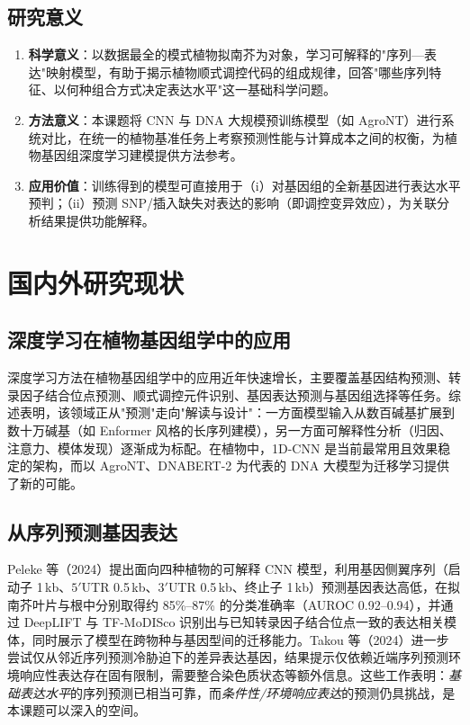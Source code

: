\documentclass[UTF8,11pt,a4paper]{ctexart}
\begin{document}
\subsection{研究意义}
\label{sec:intro-sig}

\begin{enumerate}
\item \textbf{科学意义}：以数据最全的模式植物拟南芥为对象，学习可解释的"序列—表达"映射模型，有助于揭示植物顺式调控代码的组成规律，回答"哪些序列特征、以何种组合方式决定表达水平"这一基础科学问题。
\item \textbf{方法意义}：本课题将 CNN 与 DNA 大规模预训练模型（如 AgroNT\cite{mendoza2024}）进行系统对比，在统一的植物基准任务上考察预测性能与计算成本之间的权衡，为植物基因组深度学习建模提供方法参考。
\item \textbf{应用价值}：训练得到的模型可直接用于（i）对基因组的全新基因进行表达水平预判；（ii）预测 SNP/插入缺失对表达的影响（即调控变异效应），为关联分析结果提供功能解释。
\end{enumerate}

\section{国内外研究现状}
\label{sec:survey}

\subsection{深度学习在植物基因组学中的应用}
\label{sec:survey-overview}

深度学习方法在植物基因组学中的应用近年快速增长，主要覆盖基因结构预测、转录因子结合位点预测、顺式调控元件识别、基因表达预测与基因组选择等任务。综述表明，该领域正从"预测"走向"解读与设计"：一方面模型输入从数百碱基扩展到数十万碱基（如 Enformer 风格的长序列建模），另一方面可解释性分析（归因、注意力、模体发现）逐渐成为标配\cite{hu2023}。在植物中，1D-CNN 是当前最常用且效果稳定的架构，而以 AgroNT、DNABERT-2 为代表的 DNA 大模型为迁移学习提供了新的可能\cite{mendoza2024}。

\subsection{从序列预测基因表达}
\label{sec:survey-expr}

Peleke 等（2024）提出面向四种植物的可解释 CNN 模型，利用基因侧翼序列（启动子 1\,kb、$5'$UTR 0.5\,kb、$3'$UTR 0.5\,kb、终止子 1\,kb）预测基因表达高低，在拟南芥叶片与根中分别取得约 85\%--87\% 的分类准确率（AUROC 0.92--0.94），并通过 DeepLIFT 与 TF-MoDISco 识别出与已知转录因子结合位点一致的表达相关模体，同时展示了模型在跨物种与基因型间的迁移能力\cite{peleke2024}。Takou 等（2024）进一步尝试仅从邻近序列预测冷胁迫下的差异表达基因，结果提示仅依赖近端序列预测环境响应性表达存在固有限制，需要整合染色质状态等额外信息\cite{takou2024}。这些工作表明：\emph{基础表达水平}的序列预测已相当可靠，而\emph{条件性/环境响应表达}的预测仍具挑战，是本课题可以深入的空间。
\end{document}

